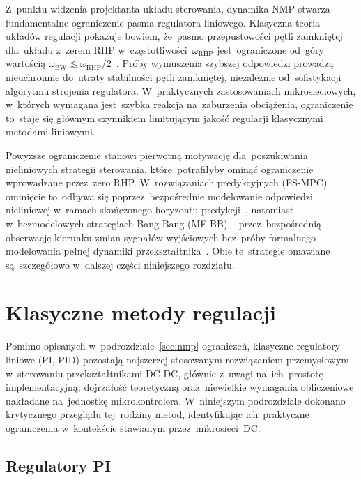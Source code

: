 Z~punktu widzenia projektanta układu sterowania, dynamika NMP stwarza fundamentalne ograniczenie pasma regulatora liniowego. Klasyczna teoria układów regulacji pokazuje bowiem, że~pasmo przepustowości pętli zamkniętej dla~układu z~zerem RHP w~częstotliwości~$\omega_{\mathrm{RHP}}$ jest~ograniczone od~góry wartością $\omega_{\mathrm{BW}} \lesssim \omega_{\mathrm{RHP}}/2$~\cite{erickson2020}. Próby wymuszenia szybszej odpowiedzi prowadzą nieuchronnie do~utraty stabilności pętli zamkniętej, niezależnie od~sofistykacji algorytmu strojenia regulatora. W~praktycznych zastosowaniach mikrosieciowych, w~których wymagana jest~szybka reakcja na~zaburzenia obciążenia, ograniczenie to~staje się głównym czynnikiem limitującym jakość regulacji klasycznymi metodami liniowymi.

Powyższe ograniczenie stanowi pierwotną motywację dla~poszukiwania nieliniowych strategii sterowania, które~potrafiłyby ominąć ograniczenie wprowadzane przez~zero RHP. W~rozwiązaniach predykcyjnych (FS-MPC) ominięcie to~odbywa się poprzez~bezpośrednie modelowanie odpowiedzi nieliniowej w~ramach skończonego horyzontu predykcji~\cite{tatari2025splitcost}, natomiast w~bezmodelowych strategiach Bang-Bang (MF-BB) -- przez~bezpośrednią obserwację kierunku zmian sygnałów wyjściowych bez~próby formalnego modelowania pełnej dynamiki przekształtnika~\cite{tatari2024mfbb}. Obie te~strategie omawiane są~szczegółowo w~dalszej części niniejszego rozdziału.

\section{Klasyczne metody regulacji}
\label{sec:klasyczne}

Pomimo opisanych w~podrozdziale~\ref{sec:nmp} ograniczeń, klasyczne regulatory liniowe (PI, PID) pozostają najszerzej stosowanym rozwiązaniem przemysłowym w~sterowaniu przekształtnikami DC-DC, głównie z~uwagi na~ich~prostotę implementacyjną, dojrzałość teoretyczną oraz~niewielkie wymagania obliczeniowe nakładane na~jednostkę mikrokontrolera. W~niniejszym podrozdziale dokonano krytycznego przeglądu tej~rodziny metod, identyfikując ich~praktyczne ograniczenia w~kontekście stawianym przez~mikrosieci~DC.

\subsection{Regulatory PI}
\label{subsec:pi}

